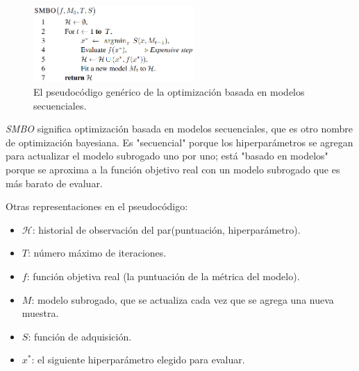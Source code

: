 \documentclass[a4paper,12pt]{article}
\begin{document}
\begin{figure}[H]
	\begin{center}
	\includegraphics[width=0.55\textwidth]{smbo.png}
  	\caption{El pseudocódigo genérico de la optimización  basada en modelos secuenciales.}
  	\label{fig:smbo}
  	\end{center}
\end{figure}

\textit{SMBO} significa optimización basada en modelos secuenciales, que es otro nombre de optimización bayesiana. Es "secuencial" porque los hiperparámetros se agregan para actualizar el modelo subrogado uno por uno; está "basado en modelos" porque se aproxima a la función objetivo real con un modelo subrogado que es más barato de evaluar.

Otras representaciones en el pseudocódigo:
\begin{itemize}
	\item{$\mathcal{H}$: historial de observación del par(puntuación, hiperparámetro).}
	\item{$T$: número máximo de iteraciones.}
	\item{$f$: función objetiva real (la puntuación de la métrica del modelo).}
	\item{$M$: modelo subrogado, que se actualiza cada vez que se agrega una nueva muestra.}
	\item{$S$: función de adquisición.}
	\item{$x^*$: el siguiente hiperparámetro elegido para evaluar.}
\end{itemize}
\end{document}
